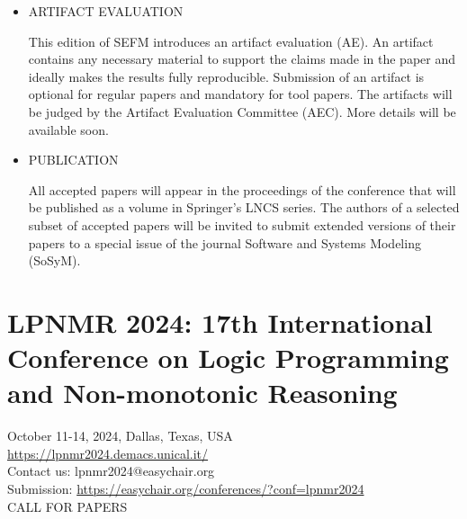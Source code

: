 \documentclass[prodmode,acmtecs]{acmsmall} %
\begin{document}
\begin{itemize}
\item  ARTIFACT EVALUATION  
 
  This edition of SEFM introduces an artifact evaluation (AE). An artifact contains any necessary material to support the claims made in the paper and ideally makes the results fully reproducible. Submission of an artifact is optional for regular papers and mandatory for tool papers. The artifacts will be judged by the Artifact Evaluation Committee (AEC). More details will be available soon. 
 
\item  PUBLICATION  
 
  All accepted papers will appear in the proceedings of the conference that will be published as a volume in Springer’s LNCS series. The authors of a selected subset of accepted papers will be invited to submit extended versions of their papers to a special issue of the journal Software and Systems Modeling (SoSyM). 
 
\end{itemize}\section{LPNMR 2024: 17th International Conference on Logic Programming and Non-monotonic Reasoning }\label{LPNMR2024}  October 11-14, 2024, Dallas, Texas, USA\\ 
  \href{https://lpnmr2024.demacs.unical.it/}{https://lpnmr2024.demacs.unical.it/}\\ 
  Contact us: lpnmr2024@easychair.org\\ 
  Submission: \href{https://easychair.org/conferences/?conf=lpnmr2024}{https://easychair.org/conferences/?conf=lpnmr2024}\\ 
CALL FOR PAPERS 
\end{document}
